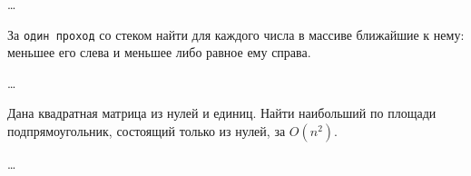 \begin{solution}
    \dots
\end{solution}


\begin{problem}
    За \texttt{один проход} со стеком найти для каждого числа в массиве ближайшие к нему: меньшее его слева и меньшее либо равное ему справа.
\end{problem}

\begin{solution}
    \dots
\end{solution}


\begin{problem}
    Дана квадратная матрица из нулей и единиц. Найти наибольший по площади
    подпрямоугольник, состоящий только из нулей, за $O(n^2)$.
\end{problem}

\begin{solution}
    \dots
\end{solution}


\clearpage
